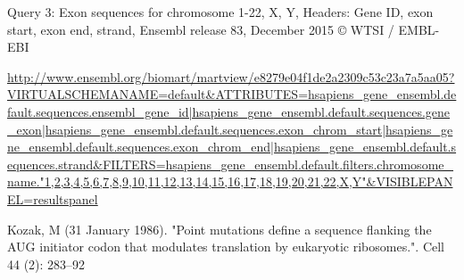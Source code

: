 \documentclass[10pt,letterpaper]{article}
\begin{document}
\begin{thebibliography}{10}
Query 3: Exon sequences for chromosome 1-22, X, Y, Headers: Gene ID, exon start, exon end, strand, Ensembl release 83, December 2015 © WTSI / EMBL-EBI

\url{http://www.ensembl.org/biomart/martview/e8279e04f1de2a2309c53c23a7a5aa05?VIRTUALSCHEMANAME=default&ATTRIBUTES=hsapiens_gene_ensembl.default.sequences.ensembl_gene_id|hsapiens_gene_ensembl.default.sequences.gene_exon|hsapiens_gene_ensembl.default.sequences.exon_chrom_start|hsapiens_gene_ensembl.default.sequences.exon_chrom_end|hsapiens_gene_ensembl.default.sequences.strand&FILTERS=hsapiens_gene_ensembl.default.filters.chromosome_name."1,2,3,4,5,6,7,8,9,10,11,12,13,14,15,16,17,18,19,20,21,22,X,Y"&VISIBLEPANEL=resultspanel}

Kozak, M (31 January 1986). "Point mutations define a sequence flanking the AUG initiator codon that modulates translation by eukaryotic ribosomes.". Cell 44 (2): 283–92

\end{thebibliography}
\end{document}
